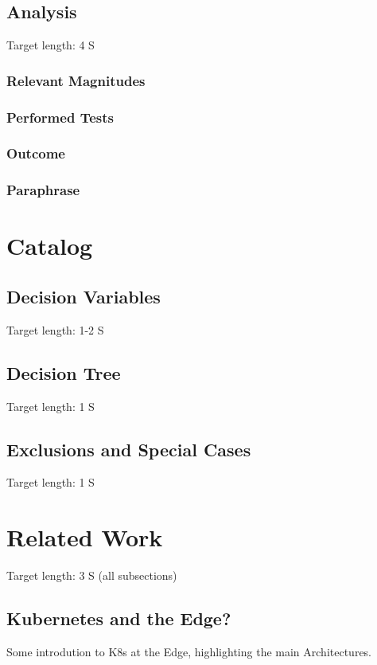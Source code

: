 \documentclass[MSC,Master,english]{twbook}%
\begin{document}
\section{Analysis}
\label{sec:dsranalysis}
Target length: 4 S
\subsection{Relevant Magnitudes}
\subsection{Performed Tests}
\subsection{Outcome}
\subsection{Paraphrase}



\chapter{Catalog}
\label{chap:catalog}

\section{Decision Variables}
\label{sec:variables}
 
Target length: 1-2 S

\section{Decision Tree}
\label{sec:tree}
Target length: 1 S

\section{Exclusions and Special Cases}
\label{sec:exclusions}
Target length: 1 S



\chapter{Related Work}
\label{chap:related}
Target length: 3 S (all subsections)
\section{Kubernetes and the Edge?}
Some introdution to K8s at the Edge, highlighting the main Architectures.
\end{document}
